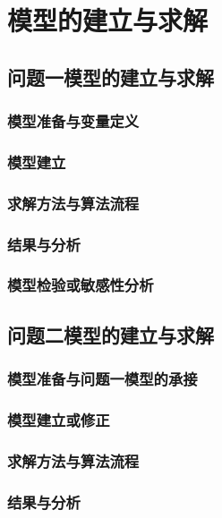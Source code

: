 \section{模型的建立与求解}

\subsection{问题一模型的建立与求解}
\subsubsection{模型准备与变量定义}
\subsubsection{模型建立}
\subsubsection{求解方法与算法流程}
\subsubsection{结果与分析}
\subsubsection{模型检验或敏感性分析}

\subsection{问题二模型的建立与求解}
\subsubsection{模型准备与问题一模型的承接}
\subsubsection{模型建立或修正}
\subsubsection{求解方法与算法流程}
\subsubsection{结果与分析}
